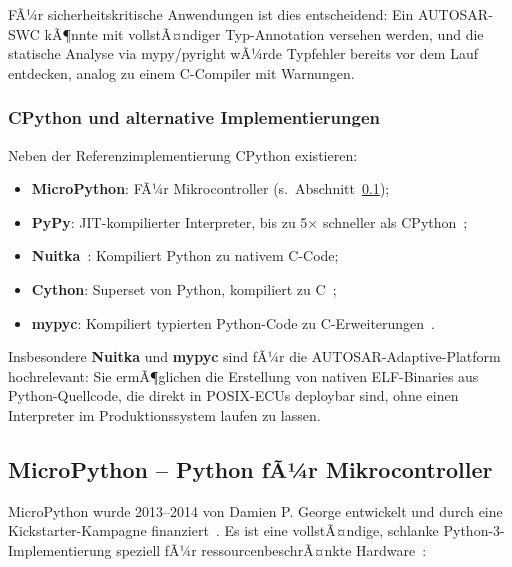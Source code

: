 ﻿\documentclass[12pt,a4paper,twoside]{article}
\begin{document}
FÃ¼r sicherheitskritische Anwendungen ist dies entscheidend:
Ein AUTOSAR-SWC kÃ¶nnte mit vollstÃ¤ndiger Typ-Annotation versehen werden,
und die statische Analyse via mypy/pyright wÃ¼rde Typfehler bereits
vor dem Lauf entdecken, analog zu einem C-Compiler mit Warnungen.

\subsubsection{CPython und alternative Implementierungen}
Neben der Referenzimplementierung CPython existieren:
\begin{itemize}
  \item \textbf{MicroPython}: FÃ¼r Mikrocontroller (s.\ Abschnitt~\ref{subsec:micropython});
  \item \textbf{PyPy}: JIT-kompilierter Interpreter, bis zu 5$\times$ schneller als CPython~\cite{pypy_bolz2009};
  \item \textbf{Nuitka}~\cite{nuitka}: Kompiliert Python zu nativem C-Code;
  \item \textbf{Cython}: Superset von Python, kompiliert zu C~\cite{cython_book};
  \item \textbf{mypyc}: Kompiliert typierten Python-Code zu C-Erweiterungen~\cite{mypyc2022}.
\end{itemize}

Insbesondere \textbf{Nuitka} und \textbf{mypyc} sind fÃ¼r die AUTOSAR-Adaptive-Platform
hochrelevant: Sie ermÃ¶glichen die Erstellung von nativen ELF-Binaries aus
Python-Quellcode, die direkt in POSIX-ECUs deploybar sind, ohne
einen Interpreter im Produktionssystem laufen zu lassen.

\subsection{MicroPython -- Python fÃ¼r Mikrocontroller}
\label{subsec:micropython}

MicroPython wurde 2013--2014 von Damien P. George entwickelt und
durch eine Kickstarter-Kampagne finanziert~\cite{george2014micropython}.
Es ist eine vollstÃ¤ndige, schlanke Python-3-Implementierung
speziell fÃ¼r ressourcenbeschrÃ¤nkte Hardware~\cite{micropython_main}:
\end{document}

